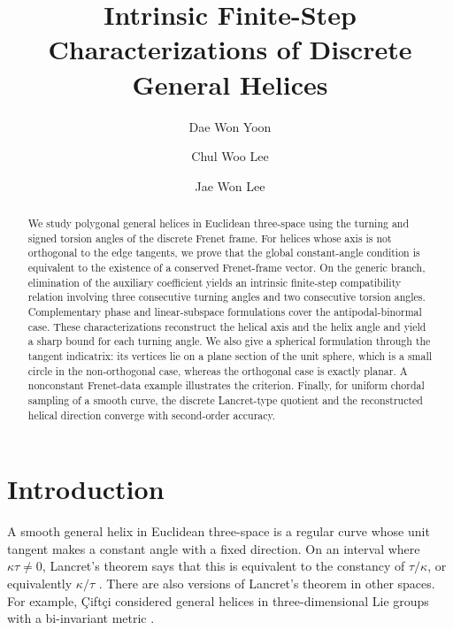 \documentclass[10pt,a4paper]{amsart}
\title[Finite-Step Characterizations of Discrete General Helices]
{Intrinsic Finite-Step Characterizations of Discrete General Helices}
\author{Dae Won Yoon}
\author{Chul Woo Lee}
\author{Jae Won Lee}
\theoremstyle{definition}
\theoremstyle{remark}
\numberwithin{equation}{section}
\begin{document}
\begin{abstract}
We study polygonal general helices in Euclidean three-space using the turning and signed torsion angles of the discrete Frenet frame. For helices whose axis is not orthogonal to the edge tangents, we prove that the global constant-angle condition is equivalent to the existence of a conserved Frenet-frame vector. On the generic branch, elimination of the auxiliary coefficient yields an intrinsic finite-step compatibility relation involving three consecutive turning angles and two consecutive torsion angles. Complementary phase and linear-subspace formulations cover the antipodal-binormal case. These characterizations reconstruct the helical axis and the helix angle and yield a sharp bound for each turning angle. We also give a spherical formulation through the tangent indicatrix: its vertices lie on a plane section of the unit sphere, which is a small circle in the non-orthogonal case, whereas the orthogonal case is exactly planar. A nonconstant Frenet-data example illustrates the criterion. Finally, for uniform chordal sampling of a smooth curve, the discrete Lancret-type quotient and the reconstructed helical direction converge with second-order accuracy.
\end{abstract}

\maketitle

\section{Introduction}

A smooth general helix in Euclidean three-space is a regular curve whose unit tangent makes a constant angle with a fixed direction. On an interval where $\kappa\tau\ne0$, Lancret's theorem says that this is equivalent to the constancy of $\tau/\kappa$, or equivalently $\kappa/\tau$ \cite{Struik1988}. There are also versions of Lancret's theorem in other spaces. For example, \c{C}ift\c{c}i considered general helices in three-dimensional Lie groups with a bi-invariant metric \cite{Ciftci2009}.
\end{document}
